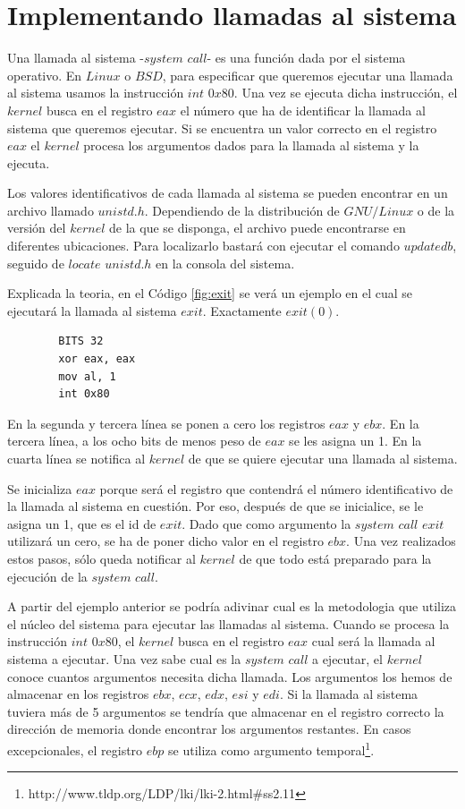 \documentclass [titlepage, 12pt]{article}
\begin{document}
\section{Implementando llamadas al sistema}

Una llamada al sistema -$system$ $call$- es una funci\'on dada por el sistema operativo. En $Linux$ o $BSD$, para especificar que queremos ejecutar una llamada al sistema usamos la instrucci\'on $int$ $0x80$. Una vez se ejecuta dicha instrucci\'on, el $kernel$ busca en el registro $eax$ el n\'umero que ha de identificar la llamada al sistema que queremos ejecutar. Si se encuentra un valor correcto en el registro $eax$ el $kernel$ procesa los argumentos dados para la llamada al sistema y la ejecuta.\bigskip

Los valores identificativos de cada llamada al sistema se pueden encontrar en un archivo llamado $unistd.h$. Dependiendo de la distribuci\'on de $GNU/Linux$ o de la versi\'on del $kernel$ de la que se disponga, el archivo puede encontrarse en diferentes ubicaciones. Para localizarlo bastar\'a con ejecutar el comando $updatedb$, seguido de $locate$ $unistd.h$ en la consola del sistema.\bigskip

Explicada la teoria, en el C\'odigo \ref{fig:exit} se ver\'a un ejemplo en el cual se ejecutar\'a la llamada al sistema $exit$. Exactamente $exit(0)$.

\lstset{language=[x86masm]Assembler,caption=Llamada al sistema $exit$,label=fig:exit}
\begin{lstlisting}	
		BITS 32
		xor eax, eax
		mov al, 1
		int 0x80
\end{lstlisting}

En la segunda y tercera l\'inea se ponen a cero los registros $eax$ y $ebx$. En la tercera l\'inea, a los ocho bits de menos peso de $eax$ se les asigna un 1. En la cuarta l\'inea se notifica al $kernel$ de que se quiere ejecutar una llamada al sistema.\bigskip

Se inicializa $eax$ porque ser\'a el registro que contendr\'a el n\'umero identificativo de la llamada al sistema en cuesti\'on. Por eso, despu\'es de que se inicialice, se le asigna un 1, que es el id de $exit$. Dado que como argumento la $system$ $call$ $exit$ utilizar\'a un cero, se ha de poner dicho valor en el registro $ebx$. Una vez realizados estos pasos, s\'olo queda notificar al $kernel$ de que todo est\'a preparado para la ejecuci\'on de la $system$ $call$.\bigskip

A partir del ejemplo anterior se podr\'ia adivinar cual es la metodologia que utiliza el n\'ucleo del sistema para ejecutar las llamadas al sistema. Cuando se procesa la instrucci\'on $int$ $0x80$, el $kernel$ busca en el registro $eax$ cual ser\'a la llamada al sistema a ejecutar. Una vez sabe cual es la $system$ $call$ a ejecutar, el $kernel$ conoce cuantos argumentos necesita dicha llamada. Los argumentos los hemos de almacenar en los registros $ebx$, $ecx$, $edx$, $esi$ y $edi$. Si la llamada al sistema tuviera m\'as de 5 argumentos se tendr\'ia que almacenar en el registro correcto la direcci\'on de memoria donde encontrar los argumentos restantes. En casos excepcionales, el registro $ebp$ se utiliza como argumento temporal\footnote{http://www.tldp.org/LDP/lki/lki-2.html\#ss2.11}. \pagebreak
\end{document}
